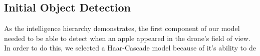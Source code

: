 \subsection{Initial Object Detection}
As the intelligence hierarchy demonstrates, the first component of our model needed to be able to detect when an apple appeared in the drone's field of view. 
In order to do this, we selected a Haar-Cascade model because of it's ability to de